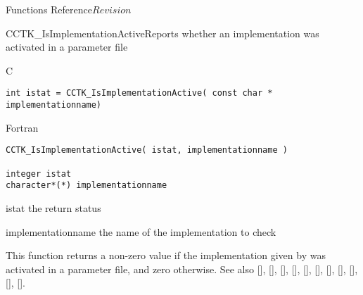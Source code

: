 \begin{cactuspart}{ Functions Reference}{}{$Revision$}
\begin{FunctionDescription}{CCTK\_IsImplementationActive}{Reports whether an implementation was activated in a parameter file}
\label{CCTK-IsImplementationActive}
\begin{SynopsisSection}
\begin{Synopsis}{C}
\begin{verbatim}int istat = CCTK_IsImplementationActive( const char * implementationname)\end{verbatim}
\end{Synopsis}
\begin{Synopsis}{Fortran}
\begin{verbatim}CCTK_IsImplementationActive( istat, implementationname ) 

integer istat
character*(*) implementationname \end{verbatim}
\end{Synopsis}
\end{SynopsisSection}
\begin{ParameterSection}
\begin{Parameter}{istat}
the return status
\end{Parameter}
\begin{Parameter}{implementationname}
the name of the implementation to check
\end{Parameter}
\end{ParameterSection}
\begin{Discussion}
This function returns a non-zero value if the implementation given by
 was activated in a parameter file, and zero
otherwise.
See also
 [\pageref{CCTK-ActivatingThorn}],
 [\pageref{CCTK-CompiledImplementation}],
 [\pageref{CCTK-CompiledThorn}],
 [\pageref{CCTK-ImplementationRequires}],
 [\pageref{CCTK-ImplementationThorn}],
 [\pageref{CCTK-ImpThornList}],
 [\pageref{CCTK-IsImplementationCompiled}],
 [\pageref{CCTK-IsThornActive}],
 [\pageref{CCTK-NumCompiledImplementations}],
 [\pageref{CCTK-NumCompiledThorns}],
 [\pageref{CCTK-ThornImplementation}].
\end{Discussion}
\end{FunctionDescription}


\end{cactuspart}

